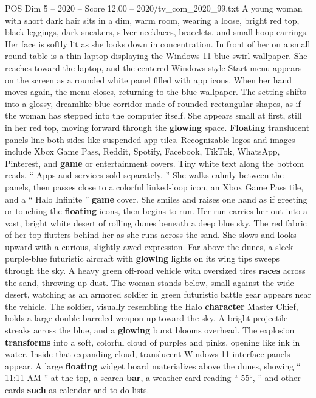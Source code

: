 \begin{textsample}{POS Dim 5 – 2020 – Score 12.00 – 2020/tv\_com\_2020\_99.txt}  \label{ex:f5_pos_062}
A young woman with short dark hair sits in a dim, warm room, wearing a loose, bright red top, black leggings, dark sneakers, silver necklaces, bracelets, and small hoop earrings.
Her face is softly lit as she looks down in concentration.
In front of her on a small round table is a thin laptop displaying the Windows 11 blue swirl wallpaper.
She reaches toward the laptop, and the centered Windows-style Start menu appears on the screen as a rounded white panel filled with app icons.
When her hand moves again, the menu closes, returning to the blue wallpaper.
The setting shifts into a glossy, dreamlike blue corridor made of rounded rectangular shapes, as if the woman has stepped into the computer itself.
She appears small at first, still in her red top, moving forward through the \textbf{glowing} space. \textbf{Floating} translucent panels line both sides like suspended app tiles.
Recognizable logos and images include Xbox Game Pass, Reddit, Spotify, Facebook, TikTok, WhatsApp, Pinterest, and \textbf{game} or entertainment covers.
Tiny white text along the bottom reads, “ Apps and services sold separately. ” She walks calmly between the panels, then passes close to a colorful linked-loop icon, an Xbox Game Pass tile, and a “ Halo Infinite ” \textbf{game} cover.
She smiles and raises one hand as if greeting or touching the \textbf{floating} icons, then begins to run.
Her run carries her out into a vast, bright white desert of rolling dunes beneath a deep blue sky.
The red fabric of her top flutters behind her as she runs across the sand.
She slows and looks upward with a curious, slightly awed expression.
Far above the dunes, a sleek purple-blue futuristic aircraft with \textbf{glowing} lights on its wing tips sweeps through the sky.
A heavy green off-road vehicle with oversized tires \textbf{races} across the sand, throwing up dust.
The woman stands below, small against the wide desert, watching as an armored soldier in green futuristic battle gear appears near the vehicle.
The soldier, visually resembling the Halo \textbf{character} Master Chief, holds a large double-barreled weapon up toward the sky.
A bright projectile streaks across the blue, and a \textbf{glowing} burst blooms overhead.
The explosion \textbf{transforms} into a soft, colorful cloud of purples and pinks, opening like ink in water.
Inside that expanding cloud, translucent Windows 11 interface panels appear.
A large \textbf{floating} widget board materializes above the dunes, showing “ 11:11 AM ” at the top, a search \textbf{bar}, a weather card reading “ 55{\EmojiFont °}, ” and other cards \textbf{such} as calendar and to-do lists.

\end{textsample}
